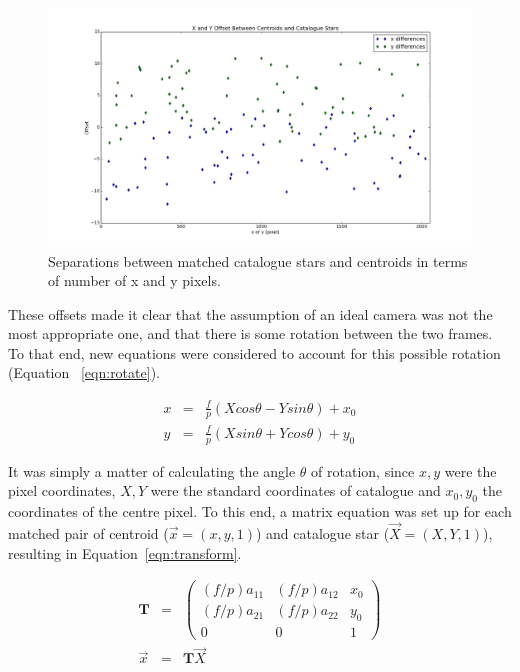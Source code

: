\documentclass[a4paper,12pt]{article}
\begin{document}
\begin{figure}[!htbp]
\centering
\includegraphics[scale=0.35]{separations.png}
\caption{Separations between matched catalogue stars and centroids in terms of number of x and y pixels.}
\label{fig:separation}
\end{figure}

These offsets made it clear that the assumption of an ideal camera was not the most appropriate one, and that there is some rotation between the two frames. To that end, new equations were considered to account for this possible rotation (Equation ~\ref{eqn:rotate}).

\begin{equation}
\begin{array}{ccl}
x &=& \frac{f}{p}(Xcos\theta - Ysin\theta)+x_{0}\\
y &=& \frac{f}{p}(Xsin\theta + Ycos\theta)+y_{0}
\end{array}
\label{eqn:rotate}
\end{equation}

It was simply a matter of calculating the angle $\theta$ of rotation, since $x,y$ were the pixel coordinates, $X,Y$ were the standard coordinates of catalogue and $x_{0},y_{0}$ the coordinates of the centre pixel. To this end, a matrix equation was set up for each matched pair of centroid ($\vec{x} = (x,y,1)$) and catalogue star ($\vec{X} = (X,Y,1)$), resulting in Equation~\ref{eqn:transform}.

\begin{eqnarray}
\mathbf{T} &=& \begin{pmatrix}
(f/p)a_{11}& (f/p)a_{12}& x_{0}\\
(f/p)a_{21}& (f/p)a_{22}& y_{0}\\
0& 0& 1
\end{pmatrix}\nonumber\\
\vec{x} &=& \mathbf{T}\vec{X}
\label{eqn:transform}
\end{eqnarray}
\end{document}
